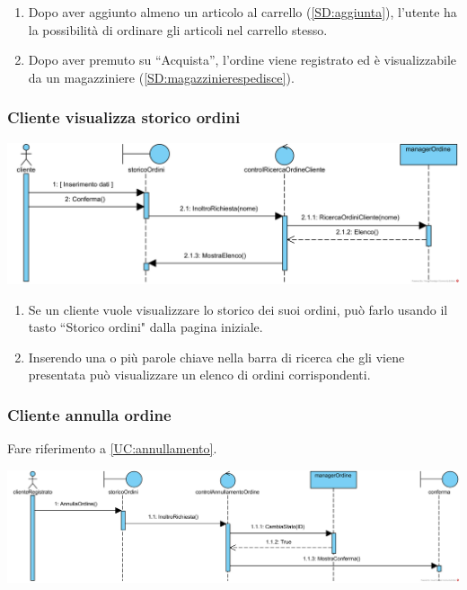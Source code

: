 \documentclass[12pt]{article}
\begin{document}
\begin{enumerate}
\item Dopo aver aggiunto almeno un articolo al carrello (\ref{SD:aggiunta}), l'utente ha la possibilità di ordinare gli articoli nel carrello stesso.
\item Dopo aver premuto su ``Acquista'', l'ordine viene registrato ed è visualizzabile da un magazziniere (\ref{SD:magazzinierespedisce}).
\end{enumerate}

\subsubsection{Cliente visualizza storico ordini}
\label{SD:storicoordini}
\begin{center}
\includegraphics[width=\textwidth]{SequenceDiagram/ClienteOrdiniRicerca}
\end{center}

\begin{enumerate}
\item Se un cliente vuole visualizzare lo storico dei suoi ordini, può farlo usando il tasto ``Storico ordini" dalla pagina iniziale.
\item Inserendo una o più parole chiave nella barra di ricerca che gli viene presentata può visualizzare un elenco di ordini corrispondenti.
\end{enumerate}

\newpage

\subsubsection{Cliente annulla ordine}
\label{SD:annull}

Fare riferimento a \ref{UC:annullamento}. \\

\begin{center}
\includegraphics[width=\textwidth]{SequenceDiagram/ClienteOrdineAnnulla}
\end{center}
\end{document}
